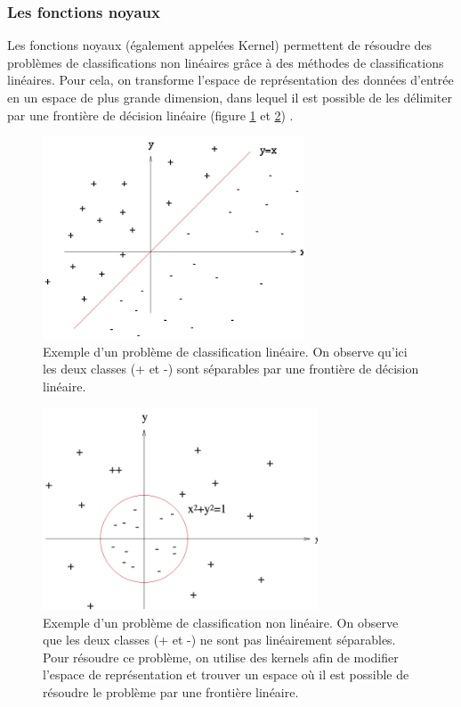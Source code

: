 \subsubsection{Les fonctions noyaux}
\label{Le Machine Learning: Les différents algorithmes: SVM: les fonctions noyaux}
Les fonctions noyaux (également appelées Kernel) permettent de résoudre des problèmes de classifications non linéaires grâce à des méthodes de classifications linéaires. Pour cela, on transforme l'espace de représentation des données d'entrée en un espace de plus grande dimension, dans lequel il est possible de les délimiter par une frontière de décision linéaire (figure \ref{fig:Svm: Exemple d'un problème de classification linéaire} et \ref{fig:Svm: Exemple d'un problème de classification non linéaire}) .

\begin{figure}[h]
	\centering\includegraphics[height=6cm]{images/svm_regression.png}
	\caption[Exemple d'un problème de classification linéaire]{Exemple d'un problème de classification linéaire. On observe qu'ici les deux classes (+ et -) sont séparables par une frontière de décision linéaire. }
	\label{fig:Svm: Exemple d'un problème de classification linéaire}
\end{figure}

\begin{figure}[h]
	\centering\includegraphics[height=6cm]{images/svm_cercle.png}
	\caption[Exemple d'un problème de classification non linéaire]{Exemple d'un problème de classification non linéaire. On observe que les deux classes (+ et -) ne sont pas linéairement séparables. Pour résoudre ce problème, on utilise des kernels afin de modifier l'espace de représentation et trouver un espace où il est possible de résoudre le problème par une frontière linéaire.}
	\label{fig:Svm: Exemple d'un problème de classification non linéaire}
\end{figure}

